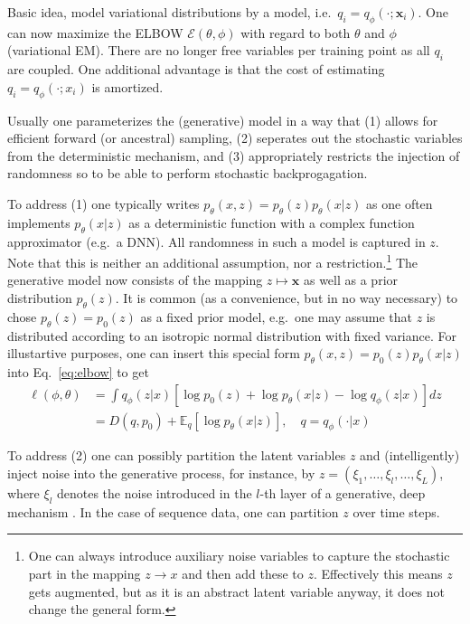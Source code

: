 \documentclass[a4paper,10pt]{article}
\newcommand\x{\mathbf x}
\newcommand\E{\mathbb E}
\begin{document}
Basic idea, model variational distributions by a model, i.e.~$q_i = q_\phi(\cdot; \x_i)$. One can now maximize the ELBOW $\mathcal E(\theta,\phi)$ with regard to both $\theta$ and $\phi$ (variational EM). There are no longer free variables per training point as all $q_i$ are coupled. One additional advantage is that the cost of estimating $q_i=q_\phi(\cdot; x_i)$ is amortized. 

Usually one parameterizes the (generative) model in a way that (1) allows for efficient forward (or ancestral) sampling, (2) seperates out the stochastic variables from the deterministic mechanism, and (3) appropriately restricts the injection of randomness so to be able to perform stochastic backprogagation. 

To address (1) one typically writes $p_\theta(x,z) = p_\theta(z) p_\theta(x|z)$ as one often implements $p_\theta(x|z)$ as a deterministic function with a complex function approximator (e.g.~a DNN). All randomness in such a model is captured in $z$. Note that this is neither an additional assumption, nor a restriction.\footnote{One can always introduce auxiliary noise variables to capture the stochastic part in the mapping $z \to x$ and then add these to $z$. Effectively this means $z$ gets augmented, but as it is an abstract latent variable anyway, it does not change the general form.} The generative model now consists of the mapping $z \mapsto \x$ as well as a prior distribution $p_{\theta}(z)$. It is common (as a convenience, but in no way necessary) to chose $p_\theta(z) = p_0(z)$ as a fixed prior model, e.g.~one may assume that $z$ is distributed according to an  isotropic normal distribution with fixed variance. 
%
For illustartive purposes, one can insert this special form $p_\theta(x,z) = p_0(z) p_\theta(x|z)$ into Eq.~\eqref{eq:elbow} to get
\begin{align}
\ell(\phi,\theta) & = \int q_\phi(z|x) \left[ \log p_0(z) + \log p_\theta(x|z) - \log q_\phi(z|x) \right] dz \\
& = D(q, p_0) +  \E_{q}\left[ \log p_\theta(x|z) \right], \quad q = q_\phi(\cdot|x)
\end{align}

To address (2) one can possibly partition the latent variables $z$ and (intelligently) inject noise into the generative process, for instance, by $z=(\xi_1,\dots,\xi_l, \dots,\xi_L)$, where $\xi_l$ denotes the noise introduced in the $l$-th layer of a generative, deep mechanism \cite{rezende2014stochastic}. In the case of sequence data, one can partition $z$ over time steps. 
\end{document}
